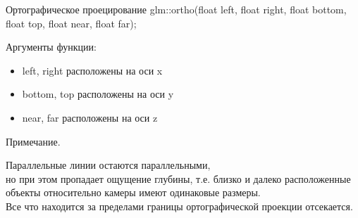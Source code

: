\documentclass{beamer}
\begin{document}
	\begin{frame}{Ортографическое проецирование}
		glm::ortho(float left, float right, float bottom, float top, float near, float far);
		
		Аргументы функции:
		\begin{itemize}
			\item 
			left, right расположены на оси x
			\item 
			bottom, top расположены на оси y
			\item 
			near, far расположены на оси z
		\end{itemize}

		Примечание.

		Параллельные линии остаются параллельными,
		\\ но при этом пропадает ощущение глубины, т.е. близко и далеко расположенные объекты относительно камеры имеют одинаковые размеры.
		\\ Все что находится за пределами границы ортографической проекции отсекается.


	\end{frame}
	
\end{document}
